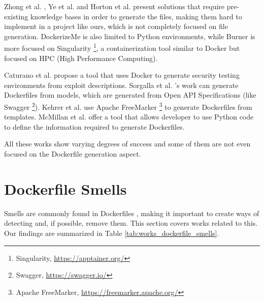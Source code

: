Zhong et al. \cite{zhongBurnerRecipeAutomatic2022}, Ye et al. \cite{yeDockerGenKnowledgeGraph2021} and Horton et al. \cite{hortonDockerizeMeAutomaticInference2019} present solutions that require pre-existing knowledge bases in order to generate the files, making them hard to implement in a project like ours, which is not completely focused on file generation. DockerizeMe is also limited to Python environments, while Burner is more focused on Singularity \footnote{Singularity, \url{https://apptainer.org/}}, a containerization tool similar to Docker but focused on HPC (High Performance Computing).



Caturano et al. \cite{caturanoExploitWP2DockerPlatformAutomating2022} propose a tool that uses Docker to generate security testing environments from exploit descriptions. Sorgalla et al. \cite{sorgallaApplyingModelDrivenEngineering2021}'s work can generate Dockerfiles from models, which are generated from Open API Specifications (like Swagger \footnote{Swagger, \url{https://swagger.io/}}). Kehrer et al. \cite{kehrerContainerBasedModuleIsolation2019} use Apache FreeMarker \footnote{Apache FreeMarker, \url{https://freemarker.apache.org/}} to generate Dockerfiles from templates. McMillan et al. \cite{mcmillanMAKINGCONTAINERSEASIER} offer a tool that allows developer to use Python code to define the information required to generate Dockerfiles.

All these works show varying degrees of success and some of them are not even focused on the Dockerfile generation aspect.

\section{Dockerfile Smells} \label{sec:dockerfile_smells}

Smells are commonly found in Dockerfiles \cite{wuCharacterizingOccurrenceDockerfile2020}, making it important to create ways of detecting and, if possible, remove them. This section covers works related to this. Our findings are summarized in Table \ref{tab:works_dockerfile_smells}.

